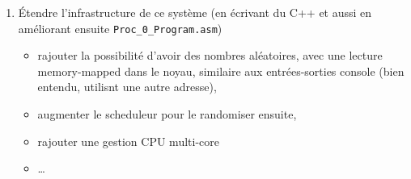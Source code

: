 \documentclass{article}
\begin{document}
\begin{enumerate}
\begin{enumerate}
  \texttt{Proc\_2\_Program.asm} (qui forment un couple
  producteur-consommateur) pour faire \'ecrire les nombres
  de 1 a 10 en m\'emoire partag\'ee depuis l'addresse 11 \'a l'adresse 20, et
  les faire lire, mais en \'ecrivant un nombre \`a la fois dans la zone critique et en rel\^achant
  donc les s\'emaphores. (n'oubliez pas que vous avez plusieurs s\'emaphores
  \`a votre disposition)
\item \'Etendre l'infrastructure de ce syst\`eme (en \'ecrivant du
  C++ et aussi en am\'eliorant ensuite \texttt{Proc\_0\_Program.asm}) 
\begin{itemize}
\item  rajouter la possibilit\'e d'avoir des nombres
  al\'eatoires, avec une lecture memory-mapped dans le noyau, similaire aux
  entr\'ees-sorties console (bien entendu, utilisnt une autre adresse), 
\item augmenter le
  scheduleur pour le randomiser ensuite, 
\item rajouter une gestion CPU multi-core
\item \dots
\end{itemize}
\end{enumerate}
\end{enumerate}
\end{document}
